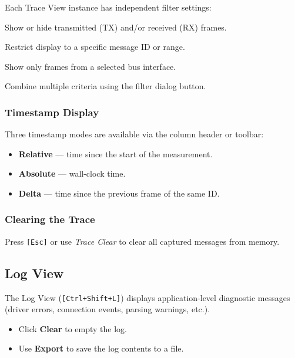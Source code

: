 \documentclass[a4paper,11pt]{article}
\newcommand{\key}[1]{\texttt{\small[#1]}}
\newcommand{\menu}[1]{\textit{#1}}
\newcommand{\ui}[1]{\textbf{#1}}
\begin{document}
Each Trace View instance has independent filter settings:

\begin{description}[leftmargin=2em, style=nextline]
  \item[TX/RX toggle] Show or hide transmitted (TX) and/or received (RX) frames.
  \item[Message ID filter] Restrict display to a specific message ID or range.
  \item[Interface filter] Show only frames from a selected bus interface.
  \item[Advanced filter dialog] Combine multiple criteria using the filter dialog button.
\end{description}

\subsubsection{Timestamp Display}

Three timestamp modes are available via the column header or toolbar:
\begin{itemize}
  \item \textbf{Relative} — time since the start of the measurement.
  \item \textbf{Absolute} — wall-clock time.
  \item \textbf{Delta} — time since the previous frame of the same ID.
\end{itemize}

\subsubsection{Clearing the Trace}

Press \key{Esc} or use \menu{Trace \textrightarrow{} Clear} to clear all captured messages
from memory.

\subsection{Log View}

The Log View (\key{Ctrl+Shift+L}) displays application-level diagnostic messages
(driver errors, connection events, parsing warnings, etc.).

\begin{itemize}
  \item Click \ui{Clear} to empty the log.
  \item Use \ui{Export} to save the log contents to a file.
\end{itemize}
\end{document}

